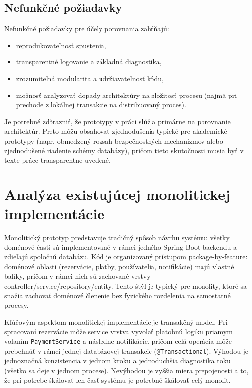 \subsection*{Nefunkčné požiadavky}

Nefunkčné požiadavky pre účely porovnania zahŕňajú:
\begin{itemize}
    \item reprodukovateľnosť spustenia,
    \item transparentné logovanie a základná diagnostika,
    \item zrozumiteľná modularita a udržiavateľnosť kódu,
    \item možnosť analyzovať dopady architektúry na zložitosť procesu (najmä pri prechode z lokálnej transakcie na distribuovaný proces).
\end{itemize}

Je potrebné zdôrazniť, že prototypy v práci slúžia primárne na porovnanie architektúr. Preto môžu obsahovať zjednodušenia typické pre akademické prototypy (napr. obmedzený rozsah bezpečnostných mechanizmov alebo zjednodušené riadenie schémy databázy), pričom tieto skutočnosti musia byť v texte práce transparentne uvedené.

\section{Analýza existujúcej monolitickej implementácie}

Monolitický prototyp predstavuje tradičný spôsob návrhu systému: všetky doménové časti sú implementované v rámci jedného Spring Boot backendu a zdieľajú spoločnú databázu. Kód je organizovaný prístupom package-by-feature: doménové oblasti (rezervácie, platby, používatelia, notifikácie) majú vlastné balíky, pričom v rámci nich sú zachované vrstvy controller/service/re\-po\-si\-tory/entity. Tento štýl je typický pre monolity, ktoré sa snažia zachovať doménové členenie bez fyzického rozdelenia na samostatné procesy.

Kľúčovým aspektom monolitickej implementácie je transakčný model. Pri spracovaní rezervácie môže service vrstva vyvolať platobnú logiku priamym volaním \texttt{PaymentService} a následne notifikácie, pričom celá operácia môže prebehnúť v rámci jednej databázovej transakcie (\texttt{@Transactional}). Výhodou je jednoznačná konzistencia v jednom kroku a jednoduchšia diagnostika toku (všetko sa deje v jednom procese). Nevýhodou je vyššia miera prepojenosti a to, že pri potrebe škálovať len časť systému je potrebné škálovať celý monolit.

